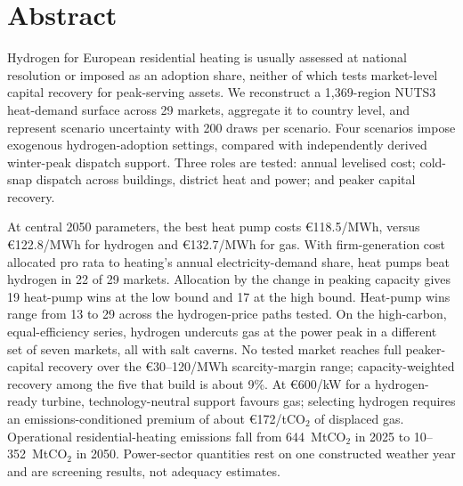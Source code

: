 
\section*{Abstract}

Hydrogen for European residential heating is usually assessed at national resolution or imposed as an adoption share, neither of which tests market-level capital recovery for peak-serving assets. We reconstruct a 1{,}369-region NUTS3 heat-demand surface across 29 markets, aggregate it to country level, and represent scenario uncertainty with 200 draws per scenario. Four scenarios impose exogenous hydrogen-adoption settings, compared with independently derived winter-peak dispatch support. Three roles are tested: annual levelised cost; cold-snap dispatch across buildings, district heat and power; and peaker capital recovery.

At central 2050 parameters, the best heat pump costs \euro{}118.5/MWh, versus \euro{}122.8/MWh for hydrogen and \euro{}132.7/MWh for gas. With firm-generation cost allocated pro rata to heating's annual electricity-demand share, heat pumps beat hydrogen in 22 of 29 markets. Allocation by the change in peaking capacity gives 19 heat-pump wins at the low bound and 17 at the high bound. Heat-pump wins range from 13 to 29 across the hydrogen-price paths tested. On the high-carbon, equal-efficiency series, hydrogen undercuts gas at the power peak in a different set of seven markets, all with salt caverns. No tested market reaches full peaker-capital recovery over the \euro{}30--120/MWh scarcity-margin range; capacity-weighted recovery among the five that build is about 9\%. At \euro{}600/kW for a hydrogen-ready turbine, technology-neutral support favours gas; selecting hydrogen requires an emissions-conditioned premium of about \euro{}172/tCO$_2$ of displaced gas. Operational residential-heating emissions fall from 644~MtCO$_2$ in 2025 to 10--352~MtCO$_2$ in 2050. Power-sector quantities rest on one constructed weather year and are screening results, not adequacy estimates.

